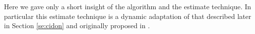\documentclass[11pt,a4paper,twoside,openright]{book}
\begin{document}
Here we gave only a short insight of the algorithm and the estimate technique. In particular this estimate technique is a dynamic adaptation of that described later in Section \ref{se:cidon} and originally proposed in \cite{cidon}.\\

\end{document}
